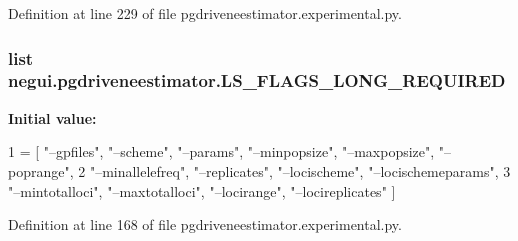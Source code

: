 Definition at line 229 of file pgdriveneestimator.\+experimental.\+py.

\subsubsection[{\texorpdfstring{L\+S\+\_\+\+F\+L\+A\+G\+S\+\_\+\+L\+O\+N\+G\+\_\+\+R\+E\+Q\+U\+I\+R\+ED}{LS_FLAGS_LONG_REQUIRED}}]{\setlength{\rightskip}{0pt plus 5cm}list negui.\+pgdriveneestimator.\+L\+S\+\_\+\+F\+L\+A\+G\+S\+\_\+\+L\+O\+N\+G\+\_\+\+R\+E\+Q\+U\+I\+R\+ED}\hypertarget{namespacenegui_1_1pgdriveneestimator_a8b1f5775794f7d387dedf1887a26c4ba}{}\label{namespacenegui_1_1pgdriveneestimator_a8b1f5775794f7d387dedf1887a26c4ba}
{\bfseries Initial value\+:}
\begin{DoxyCode}
1 = [ \textcolor{stringliteral}{"--gpfiles"}, \textcolor{stringliteral}{"--scheme"}, \textcolor{stringliteral}{"--params"}, \textcolor{stringliteral}{"--minpopsize"}, \textcolor{stringliteral}{"--maxpopsize"}, \textcolor{stringliteral}{"--poprange"}, 
2                         \textcolor{stringliteral}{"--minallelefreq"}, \textcolor{stringliteral}{"--replicates"}, \textcolor{stringliteral}{"--locischeme"}, \textcolor{stringliteral}{"--locischemeparams"},  
3                         \textcolor{stringliteral}{"--mintotalloci"}, \textcolor{stringliteral}{"--maxtotalloci"}, \textcolor{stringliteral}{"--locirange"}, \textcolor{stringliteral}{"--locireplicates"} ]
\end{DoxyCode}


Definition at line 168 of file pgdriveneestimator.\+experimental.\+py.

